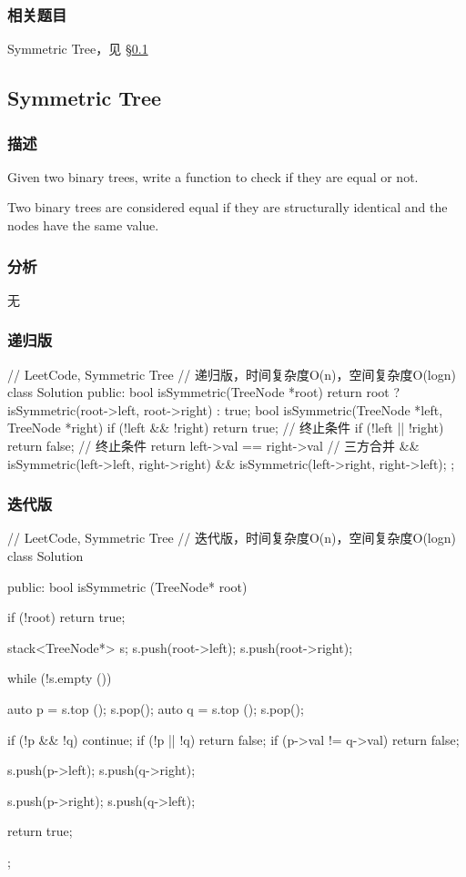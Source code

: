 \subsubsection{相关题目}
\begindot
\item Symmetric Tree，见 \S \ref{sec:symmetric-tree}
\myenddot


\subsection{Symmetric Tree}
\label{sec:symmetric-tree}


\subsubsection{描述}
Given two binary trees, write a function to check if they are equal or not.

Two binary trees are considered equal if they are structurally identical and the nodes have the same value.


\subsubsection{分析}
无


\subsubsection{递归版}
\begin{Code}
// LeetCode, Symmetric Tree
// 递归版，时间复杂度O(n)，空间复杂度O(logn)
class Solution {
public:
    bool isSymmetric(TreeNode *root) {
        return root ? isSymmetric(root->left, root->right) : true;
    }
    bool isSymmetric(TreeNode *left, TreeNode *right) {
        if (!left && !right) return true;   // 终止条件
        if (!left || !right) return false;  // 终止条件
        return left->val == right->val      // 三方合并
                && isSymmetric(left->left, right->right)
                && isSymmetric(left->right, right->left);
    }
};
\end{Code}


\subsubsection{迭代版}
\begin{Code}
// LeetCode, Symmetric Tree
// 迭代版，时间复杂度O(n)，空间复杂度O(logn)
class Solution {
public:
    bool isSymmetric (TreeNode* root) {
        if (!root) return true;

        stack<TreeNode*> s;
        s.push(root->left);
        s.push(root->right);

        while (!s.empty ()) {
            auto p = s.top (); s.pop();
            auto q = s.top (); s.pop();

            if (!p && !q) continue;
            if (!p || !q) return false;
            if (p->val != q->val) return false;

            s.push(p->left);
            s.push(q->right);

            s.push(p->right);
            s.push(q->left);
        }

        return true;
    }
};
\end{Code}



